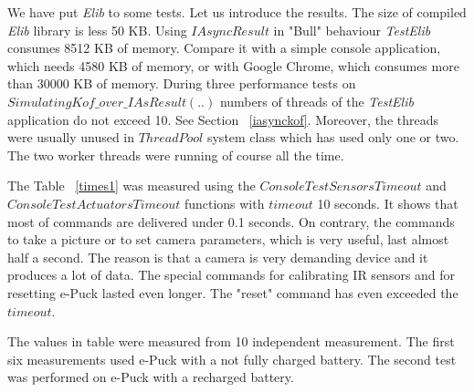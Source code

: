   We have put {\it Elib} to some tests. Let us introduce the results.
  The size of compiled {\it Elib} library is less 50 KB.
  Using $IAsyncResult$ in "Bull" behaviour  {\it TestElib} consumes 8512 KB of memory.
  Compare it with a simple console application, which needs 4580 KB of memory, or with Google Chrome, 
  which consumes more than 30000 KB of memory.
  During three performance tests on $SimulatingKof\_over\_IAsResult(..)$
  numbers of threads of the {\it TestElib} application do not exceed 10. 
  See Section ~\ref{iasynckof}. Moreover, the threads were usually unused
  in $ThreadPool$ system class which has used only one or two. 
  The two worker threads were running of course all the time.

  The Table ~\ref{times1}  was measured using the $ConsoleTestSensorsTimeout$ and
  $ConsoleTestActuatorsTimeout$ functions with $timeout$ 10 seconds.
  It shows that most of commands are delivered under 0.1 seconds. 
  On contrary, the commands to take a picture or to set camera parameters, 
  which is very useful, last almost half a second. 
  The reason is that a camera is very demanding device and it produces a lot of data.
  The special commands for calibrating IR sensors and for resetting e-Puck lasted even longer.
  The "reset" command has even exceeded the $timeout$.

  The values in table were measured from 10 independent measurement. 
  The first six measurements used e-Puck with a not fully charged battery.
  The second test was performed on e-Puck with a recharged battery.


